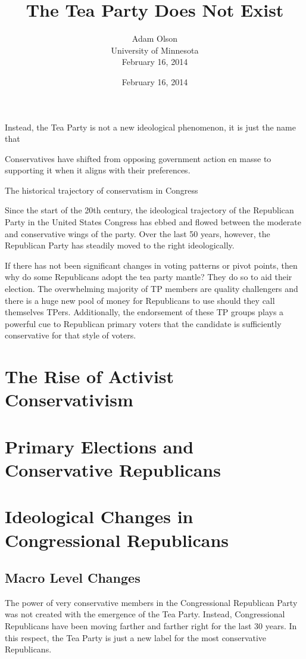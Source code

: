 \documentclass[12pt]{article}
\author{Adam Olson\\University of Minnesota\\February 16, 2014}
\title{The Tea Party Does Not Exist}
\date{February 16, 2014}
\makeatletter
\renewcommand{\maketitle}{\bgroup\setlength{\parindent}{0pt}
\begin{flushleft}
  \textbf{\@title}

  \@author
\end{flushleft}\egroup
}
\makeatother
\begin{document}
\maketitle

Instead, the Tea Party is not a new ideological phenomenon, it is just the name that 

Conservatives have shifted from opposing government action en masse to supporting it when it aligns with their preferences.


The historical trajectory of conservatism in Congress 

Since the start of the 20th century, the ideological trajectory of the Republican Party in the United States Congress has ebbed and flowed between the moderate and conservative wings of the party. Over the last 50 years, however, the Republican Party has steadily moved to the right ideologically.


If there has not been significant changes in voting patterns or pivot points, then why do some Republicans adopt the tea party mantle? They do so to aid their election. The overwhelming majority of TP members are quality challengers and there is a huge new pool of money for Republicans to use should they
call themselves TPers. Additionally, the endorsement of these TP groups plays a powerful cue to Republican primary voters that the candidate is sufficiently conservative for that style of voters.

\section{The Rise of Activist Conservativism}


\section{Primary Elections and Conservative Republicans}

\section{Ideological Changes in Congressional Republicans}
\subsection{Macro Level Changes}
The power of very conservative members in the Congressional Republican Party was not created with the emergence of the Tea Party. Instead, Congressional Republicans have been moving farther and farther right for the last 30 years. In this respect, the Tea Party is just a new label for the most conservative Republicans.
\end{document}
